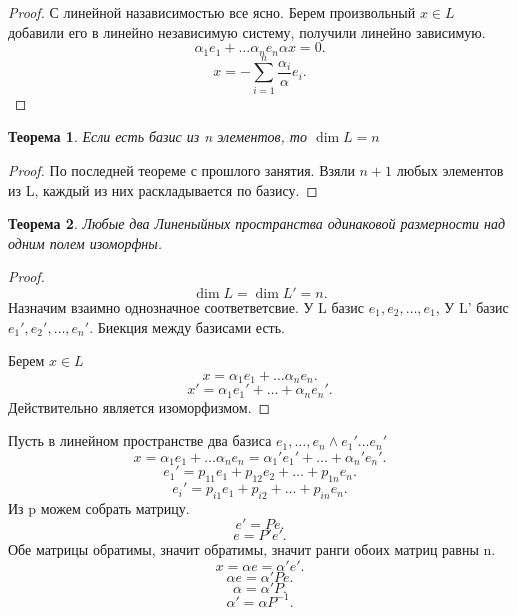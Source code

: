 \documentclass{scrartcl}
\newtheorem{theorem}{Теорема}
\begin{document}
\begin{proof}
    С линейной назависимостью все ясно. Берем произвольный $x \in L$ добавили его в линейно независимую систему, получили линейно зависимую.
     \[
         \alpha_1 e_1 +  \dots \alpha_{n}e_{n} \alpha x= 0
    .\] 
    \[
    x = -\sum_{i = 1}^{n} \frac{\alpha_{i}}{\alpha}e_{i}
    .\] 
\end{proof}
\begin{theorem}
    Если есть базис из n элементов, то $\dim{L} = n$
\end{theorem}
\begin{proof}
    По последней теореме с прошлого занятия. Взяли $n + 1$ любых элементов из L, каждый из них раскладывается по базису.
\end{proof}
\begin{theorem}
    Любые два Линеныйных пространства одинаковой размерности над одним полем изоморфны.
\end{theorem}
\begin{proof}
    \[
        \dim{L} = \dim{L'} = n
    .\] 
    Назначим взаимно однозначное соответветсвие. У L базис $e_1,e_2,\dots,e_1$, У L' базис $e_1',e_2',\dots,e_{n}'$. Биекция между базисами есть.

    Берем $x \in L$ 
     \[
    x = \alpha_1 e_1 + \dots \alpha_{n} e_{n}
    .\] 
    \[
    x' = \alpha_{1} e_1' + \dots + \alpha_{n}e_{n}'
    .\] 
    Действительно является изоморфизмом.
\end{proof}
Пусть в линейном пространстве два базиса $e_1,\dots,e_{n} \land e_1'\dots e_{n}'$ 
\[
x = \alpha_{1}e_1 + \dots \alpha_{n} e_{n} = \alpha_1'e_1' + \dots + \alpha_{n}' e_{n}'
.\] 
\[
e_1' = p_{11}e_1 + p_{12}e_2 + \dots + p_{1n}e_{n}
.\] 
\[
e_{i}' = p_{i1}e_1 + p_{i2} + \dots + p_{in}e_{n}
.\] 
Из p можем собрать матрицу.
\[
e' = P e
.\] 
\[
    e = P'e'
.\] 
Обе матрицы обратимы, значит обратимы, значит ранги обоих матриц равны n.
 \[
x = \alpha e = \alpha' e'
.\] 
\[
\alpha e = \alpha' P e
.\] 
\[
\alpha = \alpha' P
.\] 
\[
\alpha' = \alpha P^{-1}
.\] 
\end{document}
